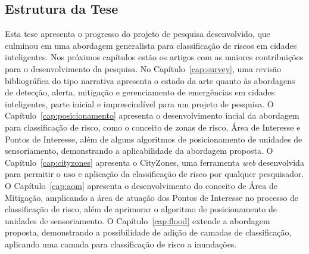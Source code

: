 \begin{refsection}
\section{Estrutura da Tese}\label{sec:publicacoes}

Esta tese apresenta o progresso do projeto de pesquisa desenvolvido, que culminou em uma abordagem generalista para classificação de riscos em cidades inteligentes. Nos próximos capítulos estão os artigos com as maiores contribuições para o desenvolvimento da pesquisa. No Capítulo~\ref{cap:survey}, uma revisão bibliográfica do tipo narrativa apresenta o estado da arte quanto às abordagens de detecção, alerta, mitigação e gerenciamento de emergências em cidades inteligentes, parte inicial e imprescindível para um projeto de pesquisa. O Capítulo~\ref{cap:posicionamento} apresenta o desenvolvimento incial da abordagem para classificação de risco, como o conceito de zonas de risco, Área de Interesse e Pontos de Interesse, além de alguns algoritmos de posicionamento de unidades de sensoriamento, demonstrando a aplicabilidade da abordagem proposta. O Capítulo~\ref{cap:cityzones} apresenta o CityZones, uma ferramenta \emph{web} desenvolvida para permitir o uso e aplicação da classificação de risco por qualquer pesquisador. O Capítulo~\ref{cap:aom} apresenta o desenvolvimento do conceito de Área de Mitigação, amplicando a área de atuação dos Pontos de Interesse no processo de classificação de risco, além de aprimorar o algoritmo de posicionamento de unidades de sensoriamento. O Capítulo~\ref{cap:flood} extende a abordagem proposta, demonstrando a possibilidade de adição de camadas de classificação, aplicando uma camada para classificação de risco a inundações.

\printbibliography[heading=subbibliography]

\end{refsection}
